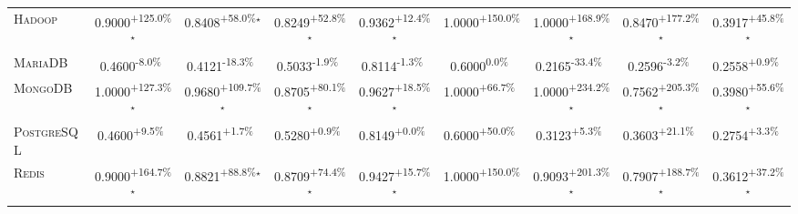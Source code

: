\begin{table}[htbp]
\begin{tabular}{l|cccc|cccc}
\textsc{Hadoop} & \cellcolor{green!30}0.9000\textsuperscript{+125.0\%}$^\star$ & \cellcolor{green!30}0.8408\textsuperscript{+58.0\%}$^\star$ & \cellcolor{green!30}0.8249\textsuperscript{+52.8\%}$^\star$ & \cellcolor{green!30}0.9362\textsuperscript{+12.4\%}$^\star$ & \cellcolor{green!30}1.0000\textsuperscript{+150.0\%}$^{\,\,\,}$ & \cellcolor{green!30}1.0000\textsuperscript{+168.9\%}$^\star$ & \cellcolor{green!30}0.8470\textsuperscript{+177.2\%}$^\star$ & \cellcolor{green!30}0.3917\textsuperscript{+45.8\%}$^\star$ \\
\textsc{MariaDB} & \cellcolor{red!30}0.4600\textsuperscript{-8.0\%}$^{\,\,\,}$ & \cellcolor{red!30}0.4121\textsuperscript{-18.3\%}$^{\,\,\,}$ & \cellcolor{red!30}0.5033\textsuperscript{-1.9\%}$^{\,\,\,}$ & \cellcolor{red!30}0.8114\textsuperscript{-1.3\%}$^{\,\,\,}$ & \cellcolor{red!30}0.6000\textsuperscript{0.0\%}$^{\,\,\,}$ & \cellcolor{red!30}0.2165\textsuperscript{-33.4\%}$^{\,\,\,}$ & \cellcolor{red!30}0.2596\textsuperscript{-3.2\%}$^{\,\,\,}$ & \cellcolor{green!30}0.2558\textsuperscript{+0.9\%}$^{\,\,\,}$ \\
\textsc{MongoDB} & \cellcolor{green!30}1.0000\textsuperscript{+127.3\%}$^\star$ & \cellcolor{green!30}0.9680\textsuperscript{+109.7\%}$^\star$ & \cellcolor{green!30}0.8705\textsuperscript{+80.1\%}$^\star$ & \cellcolor{green!30}0.9627\textsuperscript{+18.5\%}$^\star$ & \cellcolor{green!30}1.0000\textsuperscript{+66.7\%}$^{\,\,\,}$ & \cellcolor{green!30}1.0000\textsuperscript{+234.2\%}$^\star$ & \cellcolor{green!30}0.7562\textsuperscript{+205.3\%}$^\star$ & \cellcolor{green!30}0.3980\textsuperscript{+55.6\%}$^\star$ \\
\textsc{PostgreSQL} & \cellcolor{green!30}0.4600\textsuperscript{+9.5\%}$^{\,\,\,}$ & \cellcolor{green!30}0.4561\textsuperscript{+1.7\%}$^{\,\,\,}$ & \cellcolor{green!30}0.5280\textsuperscript{+0.9\%}$^{\,\,\,}$ & \cellcolor{green!30}0.8149\textsuperscript{+0.0\%}$^{\,\,\,}$ & \cellcolor{green!30}0.6000\textsuperscript{+50.0\%}$^{\,\,\,}$ & \cellcolor{green!30}0.3123\textsuperscript{+5.3\%}$^{\,\,\,}$ & \cellcolor{green!30}0.3603\textsuperscript{+21.1\%}$^{\,\,\,}$ & \cellcolor{green!30}0.2754\textsuperscript{+3.3\%}$^{\,\,\,}$ \\
\textsc{Redis} & \cellcolor{green!30}0.9000\textsuperscript{+164.7\%}$^\star$ & \cellcolor{green!30}0.8821\textsuperscript{+88.8\%}$^\star$ & \cellcolor{green!30}0.8709\textsuperscript{+74.4\%}$^\star$ & \cellcolor{green!30}0.9427\textsuperscript{+15.7\%}$^\star$ & \cellcolor{green!30}1.0000\textsuperscript{+150.0\%}$^{\,\,\,}$ & \cellcolor{green!30}0.9093\textsuperscript{+201.3\%}$^\star$ & \cellcolor{green!30}0.7907\textsuperscript{+188.7\%}$^\star$ & \cellcolor{green!30}0.3612\textsuperscript{+37.2\%}$^\star$ \\

\end{tabular}
\end{table}
